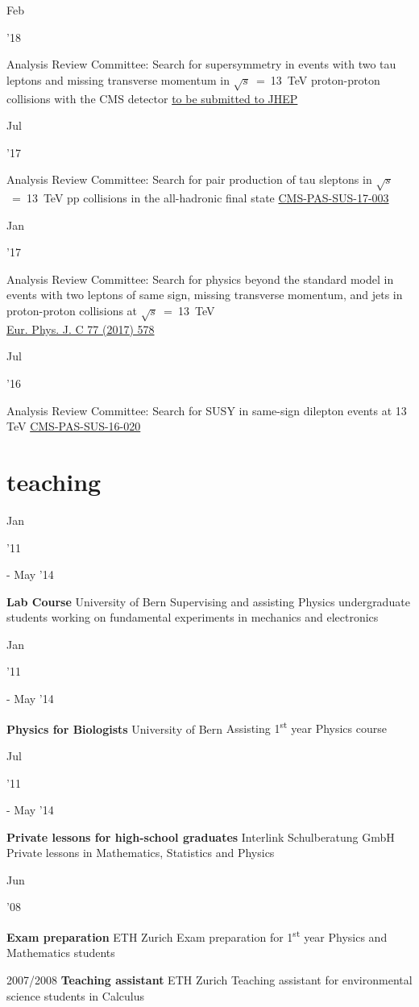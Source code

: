 \documentclass[]{cv} %
\begin{document}
\begin{entrylist}

  \entry
  {\parbox[t]{\parboxWidthOne}{Feb}\parbox[t]{\parboxWidthTwo}{\hfill '18}}
  {Analysis Review Committee: Search for supersymmetry in events with two tau
  leptons and missing transverse momentum in $\sqrt{s}$~=~13~TeV proton-proton
  collisions with the CMS detector}
  {\href{}{to be submitted to JHEP}}
  {}

  \entry
  {\parbox[t]{\parboxWidthOne}{Jul}\parbox[t]{\parboxWidthTwo}{\hfill '17}}
  {Analysis Review Committee: Search for pair production of tau sleptons in
  $\sqrt{s}$~=~13~TeV pp collisions in the all-hadronic final state}
  {\href{https://cds.cern.ch/record/2273395}{CMS-PAS-SUS-17-003}}
  {}

  \entry
  {\parbox[t]{\parboxWidthOne}{Jan}\parbox[t]{\parboxWidthTwo}{\hfill '17}}
  {Analysis Review Committee: Search for physics beyond the standard model in
  events with two leptons of same sign, missing transverse momentum, and jets in
  proton-proton collisions at $\sqrt{s}$~=~13~TeV\\}
  {\href{https://link.springer.com/article/10.1140\%2Fepjc\%2Fs10052-017-5079-z}{Eur. Phys. J. C 77 (2017) 578}}
  {}

  \entry
  {\parbox[t]{\parboxWidthOne}{Jul}\parbox[t]{\parboxWidthTwo}{\hfill '16}}
  {Analysis Review Committee: Search for SUSY in same-sign dilepton events at 13 TeV}
  {\href{https://cds.cern.ch/record/2204929}{CMS-PAS-SUS-16-020}}
  {}

\end{entrylist}

\section{teaching}

\begin{entrylist}

  \entry
  {\parbox[t]{\parboxWidthOne}{Jan}\parbox[t]{\parboxWidthTwo}{\hfill '11} - May '14}
  {\textbf{Lab Course}}
  {University of Bern}
  {Supervising and assisting Physics undergraduate students working on fundamental experiments in mechanics and electronics}

  \entry
  {\parbox[t]{\parboxWidthOne}{Jan}\parbox[t]{\parboxWidthTwo}{\hfill '11} - May '14}
  {\textbf{Physics for Biologists}}
  {University of Bern}
  {Assisting 1\textsuperscript{st} year Physics course}

  \entry
  {\parbox[t]{\parboxWidthOne}{Jul}\parbox[t]{\parboxWidthTwo}{\hfill '11} - May '14}
  {\textbf{Private lessons for high-school graduates}}
  {Interlink Schulberatung GmbH}
  {Private lessons in Mathematics, Statistics and Physics}

  \entry
  {\parbox[t]{\parboxWidthOne}{Jun}\parbox[t]{\parboxWidthTwo}{\hfill '08}}
  {\textbf{Exam preparation}}
  {ETH Zurich}
  {Exam preparation for 1\textsuperscript{st} year Physics and Mathematics students}

  \entry
  {2007/2008}
  {\textbf{Teaching assistant}}
  {ETH Zurich}
  {Teaching assistant for environmental science students in Calculus}

\end{entrylist}
\end{document}
